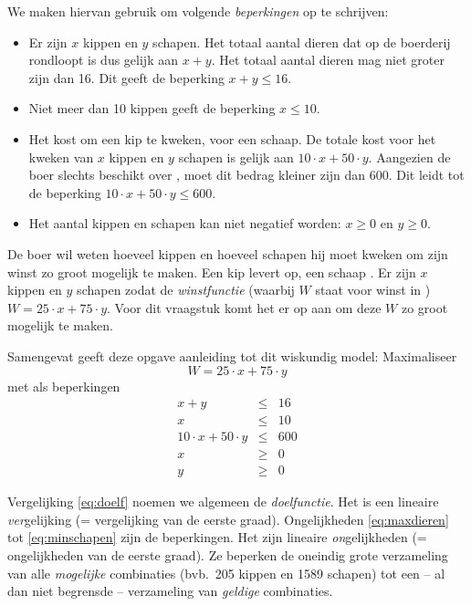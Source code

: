 We maken hiervan gebruik om volgende \textit{beperkingen} op te
schrijven:

\begin{itemize}
    \item  Er zijn $x$ kippen en $y$ schapen. Het totaal aantal dieren dat op de boerderij rondloopt is dus gelijk aan $x+y$. Het totaal aantal dieren mag niet groter zijn dan 16. Dit geeft de beperking  $x+y\leqslant 16$.

    \item  Niet meer dan 10 kippen geeft de beperking  $x\leqslant 10$.

    \item  Het kost  om een kip te kweken,  voor een
schaap. De totale kost voor het kweken van $x$ kippen en $y$ schapen  is gelijk aan 
$10\cdot x+50\cdot y$.  Aangezien de boer slechts beschikt over , moet dit bedrag kleiner zijn dan 600. Dit  leidt tot de beperking $10\cdot x+50\cdot y\leqslant 600$.

    \item  Het aantal kippen en schapen kan niet negatief worden: $x
    \geqslant 0$ en $y \geqslant 0$.
\end{itemize}

De boer wil weten hoeveel kippen en hoeveel schapen hij moet
kweken om zijn winst zo groot mogelijk te maken. Een kip levert
 op, een schaap . Er zijn $x$ kippen en $y$ schapen zodat de \textit{winstfunctie}
(waarbij $W$ staat
voor winst in \euros) $W = 25\cdot x + 75\cdot y$.
Voor dit vraagstuk komt het er op aan om deze $W$ zo groot
mogelijk te maken.

Samengevat geeft deze opgave aanleiding tot dit wiskundig
model:
\noindent
Maximaliseer
\begin{equation}
    W=25\cdot x + 75\cdot y
    \label{eq:doelf}
\end{equation}
met als beperkingen
\begin{eqnarray}
    x+y & \leqslant & 16
    \label{eq:maxdieren}  \\
    x & \leqslant & 10
    \label{eq:maxkippen}  \\
    10\cdot x+50\cdot y& \leqslant & 600
    \label{eq:maxgeld}  \\
    x & \geqslant & 0
    \label{eq:minkippen}  \\
    y & \geqslant & 0
    \label{eq:minschapen}
\end{eqnarray}


Vergelijking \eqref{eq:doelf} noemen we algemeen de \emph{doelfunctie}.
Het is een lineaire \emph{ver}gelijking
(= vergelijking van de eerste graad).
Ongelijkheden \eqref{eq:maxdieren} tot \eqref{eq:minschapen} zijn de beperkingen.
Het zijn lineaire \emph{on}gelijkheden
(= ongelijkheden van de eerste graad). Ze beperken de oneindig
grote verzameling van alle \emph{mogelijke} combinaties (bvb.\ 205
kippen en 1589 schapen) tot een -- al dan niet begrensde -- verzameling
van \emph{geldige} combinaties. 

